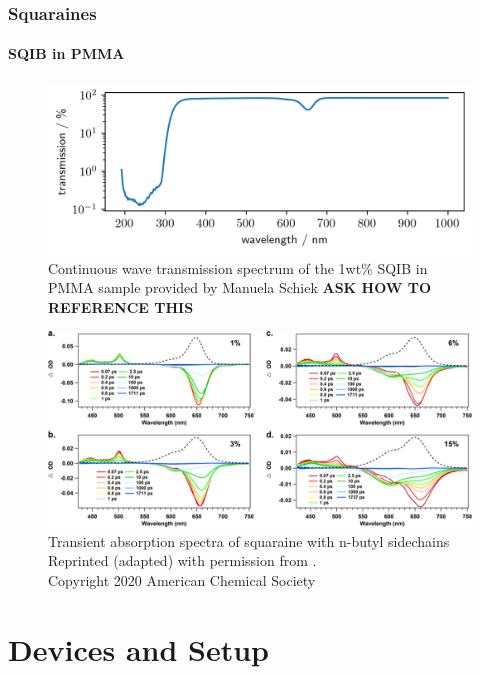 \documentclass[twoside,openright]{scrreprt}
\begin{document}
\subsection{Squaraines}
\subsubsection{SQIB in PMMA}
\begin{figure}[hbtp]
\centering
\includegraphics[width = \textwidth]{images/SQIB1percentInPMMA_transmission.png}
\caption{Continuous wave transmission spectrum of the 1wt\% SQIB in PMMA sample provided by Manuela Schiek \textbf{ASK HOW TO REFERENCE THIS}}
\end{figure}

\begin{figure}[hbtp]
\centering
\includegraphics[scale=1]{images/Zheng2020SquaraineTAgraph.jpeg}
\caption{Transient absorption spectra of squaraine with n-butyl sidechains\\
Reprinted (adapted) with permission from \protect{}. \\Copyright 2020 American Chemical Society}
\end{figure}


\chapter{Devices and Setup}
\end{document}
